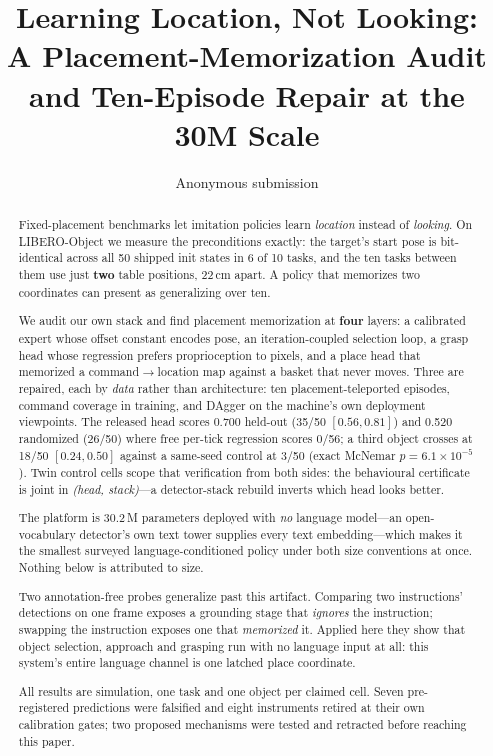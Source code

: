 \documentclass[10pt,letterpaper]{article}
\title{\bfseries Learning Location, Not Looking:\\
A Placement-Memorization Audit and Ten-Episode Repair at the 30M Scale}
\author{Anonymous submission}
\date{}
\begin{document}
\maketitle

\begin{abstract}
Fixed-placement benchmarks let imitation policies learn \emph{location} instead
of \emph{looking}. On LIBERO-Object we measure the preconditions exactly: the
target's start pose is bit-identical across all 50 shipped init states in 6 of
10 tasks, and the ten tasks between them use just \textbf{two} table positions,
22\,cm apart. A policy that memorizes two coordinates can present as
generalizing over ten.

We audit our own stack and find placement memorization at \textbf{four} layers:
a calibrated expert whose offset constant encodes pose, an iteration-coupled
selection loop, a grasp head whose regression prefers proprioception to pixels,
and a place head that memorized a command$\to$location map against a basket that
never moves. Three are repaired, each by \emph{data} rather than architecture:
ten placement-teleported episodes, command coverage in training, and DAgger on
the machine's own deployment viewpoints. The released head scores 0.700
held-out (35/50 $[0.56,0.81]$) and 0.520 randomized (26/50) where free per-tick
regression scores 0/56; a third object crosses at 18/50 $[0.24,0.50]$ against a
same-seed control at 3/50 (exact McNemar $p{=}6.1\times10^{-5}$). Twin control
cells scope that verification from both sides: the behavioural certificate is
joint in \emph{(head, stack)}---a detector-stack rebuild inverts which head
looks better.

The platform is 30.2\,M parameters deployed with \emph{no} language model---an
open-vocabulary detector's own text tower supplies every text embedding---which
makes it the smallest surveyed language-conditioned policy under both size
conventions at once. Nothing below is attributed to size.

Two annotation-free probes generalize past this artifact. Comparing two
instructions' detections on one frame exposes a grounding stage that
\emph{ignores} the instruction; swapping the instruction exposes one that
\emph{memorized} it. Applied here they show that object selection, approach and
grasping run with no language input at all: this system's entire language
channel is one latched place coordinate.

All results are simulation, one task and one object per claimed cell. Seven
pre-registered predictions were falsified and eight instruments retired at
their own calibration gates; two proposed mechanisms were tested and retracted
before reaching this paper.
\end{abstract}
\end{document}
